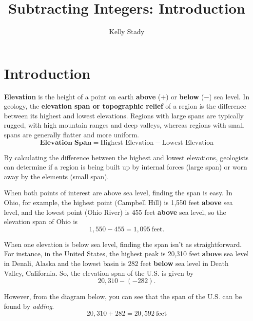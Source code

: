 \documentclass{ximera}[font=12pt]
\title{Subtracting Integers:  Introduction}   %
\author{Kelly Stady}
\begin{document}
\begin{abstract}

\end{abstract}

\maketitle
\label{xim:SubtractIntActivity}


\section*{Introduction}

\textbf{Elevation} is the height of a point on earth \textbf{above} ($+$) or \textbf{below} ($-$) sea level.  In geology, the \textbf{elevation span or topographic relief} of a region is the difference between its highest and lowest elevations. Regions with large spans are typically rugged, with high mountain ranges and deep valleys, whereas regions with small spans are generally flatter and more uniform.
\[ \textbf{Elevation Span} = \textrm{Highest Elevation} - \textrm{Lowest Elevation} \]

By calculating the difference between the highest and lowest elevations, geologists can determine if a region is being built up by internal forces (large span) or worn away by the elements (small span).

When both points of interest are above sea level, finding the span is easy.  In Ohio, for example, the highest point (Campbell Hill) is 1,550 feet \textbf{above} sea level, and the lowest point (Ohio River) is 455 feet \textbf{above} sea level, so the elevation span of Ohio is
\[ 1,550 - 455 = 1,095 \ \textrm{feet}. \]

When one elevation is below sea level, finding the span isn't as straightforward.  For instance, in the United States, the highest peak is 20,310 feet \textbf{above} sea level in Denali, Alaska and the lowest basin is 282 feet \textbf{below} sea level in Death Valley, California.  So, the elevation span of the U.S. is given by
\[ 20,310 - (-282). \]

However, from the diagram below, you can see that the span of the U.S. can be found by \emph{adding}.
\[ 20,310 + 282 = 20,592 \ \textrm{feet} \]
\end{document}
